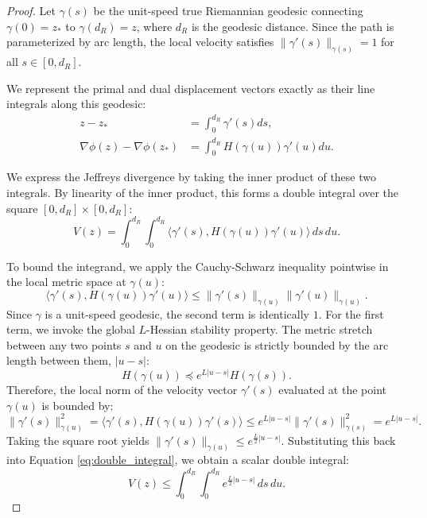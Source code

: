 \begin{proof}
Let $\gamma(s)$ be the unit-speed true Riemannian geodesic connecting $\gamma(0) = z_*$ to $\gamma(d_R) = z$, where $d_R$ is the geodesic distance. Since the path is parameterized by arc length, the local velocity satisfies $\|\gamma'(s)\|_{\gamma(s)} = 1$ for all $s \in [0, d_R]$.

We represent the primal and dual displacement vectors exactly as their line integrals along this geodesic:
\begin{align}
    z - z_* &= \int_0^{d_R} \gamma'(s) ds, \\
    \nabla \phi(z) - \nabla \phi(z_*) &= \int_0^{d_R} H(\gamma(u)) \gamma'(u) du.
\end{align}

We express the Jeffreys divergence by taking the inner product of these two integrals. By linearity of the inner product, this forms a double integral over the square $[0, d_R] \times [0, d_R]$:
\begin{equation} \label{eq:double_integral}
    V(z) = \int_0^{d_R} \int_0^{d_R} \langle \gamma'(s), H(\gamma(u)) \gamma'(u) \rangle \, ds \, du.
\end{equation}

To bound the integrand, we apply the Cauchy-Schwarz inequality pointwise in the local metric space at $\gamma(u)$:
\begin{equation}
    \langle \gamma'(s), H(\gamma(u)) \gamma'(u) \rangle \le \|\gamma'(s)\|_{\gamma(u)} \|\gamma'(u)\|_{\gamma(u)}.
\end{equation}
Since $\gamma$ is a unit-speed geodesic, the second term is identically $1$. For the first term, we invoke the global $L$-Hessian stability property. The metric stretch between any two points $s$ and $u$ on the geodesic is strictly bounded by the arc length between them, $|u - s|$:
\begin{equation}
    H(\gamma(u)) \preceq e^{L|u - s|} H(\gamma(s)).
\end{equation}
Therefore, the local norm of the velocity vector $\gamma'(s)$ evaluated at the point $\gamma(u)$ is bounded by:
\begin{equation}
    \|\gamma'(s)\|_{\gamma(u)}^2 = \langle \gamma'(s), H(\gamma(u)) \gamma'(s) \rangle \le e^{L|u - s|} \|\gamma'(s)\|_{\gamma(s)}^2 = e^{L|u - s|}.
\end{equation}
Taking the square root yields $\|\gamma'(s)\|_{\gamma(u)} \le e^{\frac{L}{2}|u - s|}$. Substituting this back into Equation \ref{eq:double_integral}, we obtain a scalar double integral:
\begin{equation}
    V(z) \le \int_0^{d_R} \int_0^{d_R} e^{\frac{L}{2}|u - s|} \, ds \, du.
\end{equation}


\end{proof}

